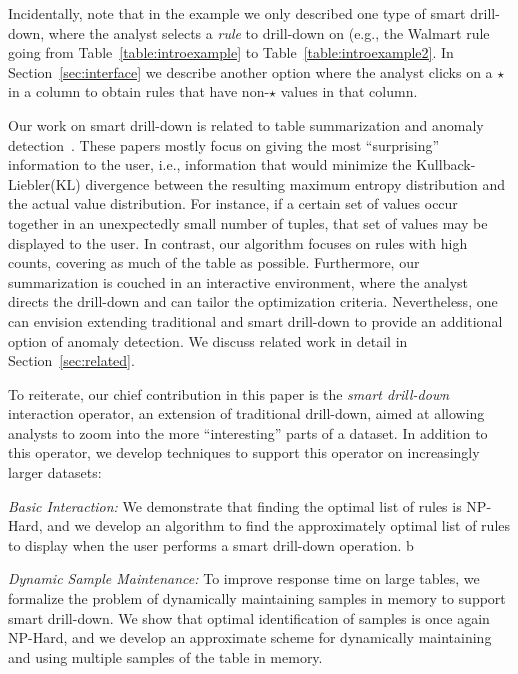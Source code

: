 Incidentally, note that in the example we only described one type of smart drill-down,
where the analyst selects a {\em rule} to drill-down on
(e.g., the Walmart rule going from Table~\ref{table:introexample} to
Table~\ref{table:introexample2}.
In Section~\ref{sec:interface} we describe another option
where the analyst clicks on a $\star$ in a column to obtain
rules that have non-$\star$ values in that column.

Our work on smart drill-down is related
to table summarization and anomaly
detection~\cite{Sarawagi:2001:UMA:767141.767148,
Sarawagi00user-adaptiveexploration,
Sarawagi98discovery-drivenexploration,
DBLP:journals/pvldb/GebalyAGKS14}.
These papers mostly focus on
giving the most ``surprising'' information to the user, i.e., information
that would minimize the Kullback-Liebler(KL) divergence between the
resulting maximum entropy distribution and the actual value distribution. For instance, if a certain set of
values occur together in an unexpectedly small number of tuples, that
set of values may be displayed to the user. In contrast, our algorithm
focuses on rules with high counts, covering as
much of the table as possible.
Furthermore, our summarization is couched in
an interactive environment, where the analyst
directs the drill-down and can tailor the optimization criteria.
Nevertheless, one can envision extending traditional
and smart drill-down to provide an additional option of anomaly detection. We discuss related work in detail in  Section~\ref{sec:related}.

To reiterate, our chief contribution in this paper is the {\em smart drill-down} interaction operator,
an extension of traditional drill-down, aimed at allowing analysts to zoom into the
more ``interesting'' parts of a dataset. In addition to this operator,
we develop techniques to support this operator on increasingly larger datasets:
\squishlist
\item {\em Basic Interaction:} We demonstrate that finding the optimal list of rules is {\sc NP-Hard},
and we develop an algorithm to find the approximately optimal list of rules to display when the user performs a smart drill-down operation. b
\item {\em Dynamic Sample Maintenance:} To improve response time on large tables, we formalize the problem of dynamically
maintaining samples in memory to support smart drill-down. 
We show that optimal identification of samples is once again {\sc NP-Hard}, and 
we develop an approximate scheme for dynamically maintaining and using multiple samples of the table in memory.
\squishend

